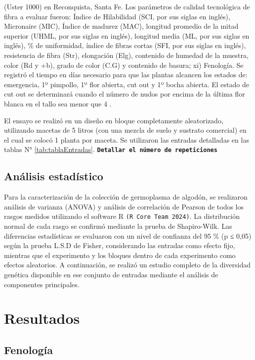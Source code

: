 \documentclass[12pt,oneside]{reedthesis}
\begin{document}
(Uster 1000) en Reconquista, Santa Fe. Los parámetros de calidad tecnológica de fibra a evaluar fueron: Índice de Hilabilidad (SCI, por sus siglas en inglés), Micronaire (MIC), Índice de madurez (MAC), longitud promedio de la mitad superior (UHML, por sus siglas en inglés), longitud media (ML, por sus siglas en inglés), \% de uniformidad, índice de fibras cortas (SFI, por sus siglas en inglés), resistencia de fibra (Str), elongación (Elg), contenido de humedad de la muestra, color (Rd y +b), grado de color (C.G) y contenido de basura; xi) Fenología. Se registró el tiempo en días necesario para que las plantas alcancen los estados de: emergencia, 1º pimpollo, 1º flor abierta, cut out y 1º bocha abierta. El estado de cut out se determinará cuando el número de nudos por encima de la última flor blanca en el tallo sea menor que 4 \autocite{bourland1992}.

El ensayo se realizó en un diseño en bloque completamente aleatorizado, utilizando macetas de 5 litros (con una mezcla de suelo y sustrato comercial) en el cual se colocó 1 planta por maceta. Se utilizaron las entradas detalladas en las tablas N° \ref{tab:tablaEntradas}. \textbf{\texttt{Detallar\ el\ número\ de\ repeticiones}}

\subsection{Análisis estadístico}\label{anuxe1lisis-estaduxedstico}

Para la caracterización de la colección de germoplasma de algodón, se realizaron análisis de varianza (ANOVA) y análisis de correlación de Pearson de todos los rasgos medidos utilizando el software R \texttt{(R\ Core\ Team\ 2024)}. La distribución normal de cada rasgo se confirmó mediante la prueba de Shapiro-Wilk. Las diferencias estadísticas se evaluaron con un nivel de confianza del 95 \% (p ≤ 0,05) según la prueba L.S.D de Fisher, considerando las entradas como efecto fijo, mientras que el experimento y los bloques dentro de cada experimento como efectos aleatorios. A continuación, se realizó un estudio completo de la diversidad genética disponible en ese conjunto de entradas mediante el análisis de componentes principales.

\section{Resultados}\label{resultados}

\subsection{Fenología}\label{fenologuxeda}
\end{document}
